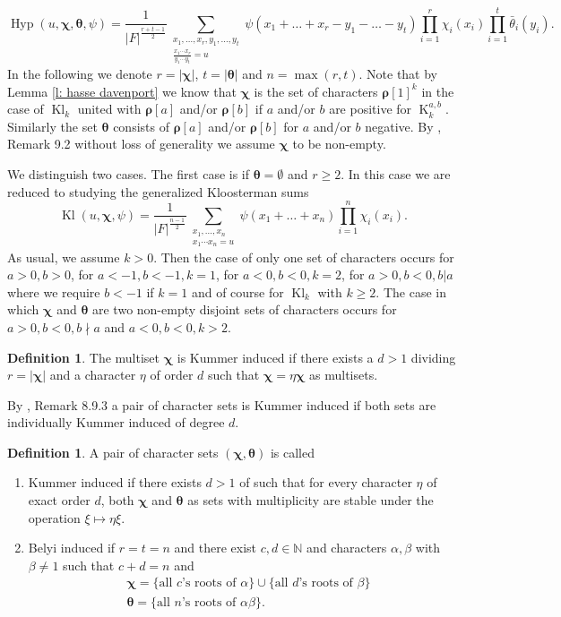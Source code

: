 \documentclass[12pt]{amsart}
\theoremstyle{plain}
\theoremstyle{definition}
\newtheorem{defi}[thm]{Definition}
\theoremstyle{remark}
\numberwithin{equation}{section}
\newcommand{\NN}{\mathbb{N}}
\renewcommand{\geq}{\geqslant}
\DeclareMathOperator{\Kl}{Kl}%
\DeclareMathOperator{\K}{K} %
\DeclareMathOperator{\Hyp}{Hyp} %
\begin{document}
$$\Hyp(u,\bm \chi,\bm \theta,\psi)=\frac{1}{|F|^{\frac{r+t-1}2}}\sum_{\substack{x_1,\ldots,x_r,y_1,\ldots,y_t\\\frac{x_1\cdots x_r}{y_1\cdots y_t}=u}}\psi(x_1+\ldots+x_r-y_1-\ldots-y_t)\prod_{i=1}^r\chi_i(x_i)\prod_{i=1}^t\bar\theta_i(y_i).$$
In the following we denote $r=|\bm\chi|$, $t=|\bm\theta|$ and $n=\max (r,t)$.
Note that by Lemma \ref{l: hasse davenport} we know that $\bm \chi$ is the set of characters $\bm \rho[1]^k$ in the case of $\Kl_k$ united with $\bm \rho[a]$ and/or $\bm \rho[b]$ if $a$ and/or $b$ are positive for $\K_k^{a,b}$. Similarly the set $\bm \theta$ consists of $\bm \rho[a]$ and/or $\bm \rho[b]$ for $a$ and/or $b$ negative. By \cite{FKMSbilinear}, Remark 9.2 without loss of generality we assume $\bm \chi$ to be non-empty.


We distinguish two cases. The first case is if $\bm \theta=\emptyset$ and $r\geq 2$. In this case we are reduced to studying the generalized Kloosterman sums
$$\Kl(u,\bm \chi,\psi)=\frac{1}{|F|^{\frac{n-1}2}}\sum_{\substack{x_1,\ldots,x_n\\x_1\cdots x_n=u}}\psi(x_1+\ldots+x_n)\prod_{i=1}^n\chi_i(x_i).$$
 As usual, we assume $k>0$. Then the case of only one set of characters occurs for $a>0, b>0$, for $a<-1,b<-1,k=1$, for $a<0,b<0,k=2$, for $a>0,b<0, b|a$ where we require $b<-1$ if $k=1$ and of course for $\Kl_k$ with $k\geq 2$.
The case in which $\bm \chi$ and $\bm\theta$ are two non-empty disjoint sets of characters occurs for $a>0,b<0, b\nmid a$ and $a<0,b<0,k>2$.





\begin{defi}
The multiset $\bm \chi$ is Kummer induced if there exists a $d>1$ dividing $r=|\bm\chi|$ and a character $\eta$ of order $d$ such that $\bm \chi =\eta \bm\chi$ as multisets. 
\end{defi}


By \cite{Katzbook}, Remark 8.9.3 a pair of character sets is Kummer induced if both sets are individually Kummer induced of degree $d$. 
\begin{defi}
A pair of character sets $(\bm \chi, \bm \theta)$ is called
\begin{enumerate}
    \item Kummer induced if there exists $d>1$ of such that for every character $\eta$ of exact order $d$, both $\bm \chi$ and $\bm \theta$ as sets with multiplicity are stable under the operation $\xi\mapsto \eta \xi$.
    \item Belyi induced if $r=t=n$ and there exist $c,d\in \NN$ and characters $\alpha,\beta$ with $\beta\neq 1$ such that $c+d=n$ and 
 \begin{align*}
    &\bm \chi =\{\text{all $c$'s roots of }\alpha\}\cup \{\text{all $d$'s roots of }\beta\} \\
    &\bm \theta = \{\text{all $n$'s roots of }\alpha\beta\}. 
     \end{align*}
\end{enumerate}
\end{defi}
\end{document}

